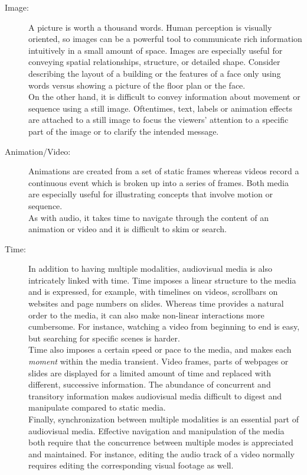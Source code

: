 \begin{description}
\item[Image:] A picture is worth a thousand words. Human perception is visually oriented, so images can be a powerful tool to communicate rich information intuitively in a small amount of space. Images are especially useful for conveying spatial relationships, structure, or detailed shape. Consider describing the layout of a building or the features of a face only using words versus showing a picture of the floor plan or the face.\\ 
On the other hand, it is difficult to convey information about movement or sequence using a still image. Oftentimes, text, labels or animation effects are attached to a still image to focus the viewers' attention to a specific part of the image or to clarify the intended message.\\

\item[Animation/Video:] Animations are created from a set of static frames whereas videos record a continuous event which is broken up into a series of frames. Both media are especially useful for illustrating concepts that involve motion or sequence.\\
As with audio, it takes time to navigate through the content of an animation or video and it is difficult to skim or search.\\

\item[Time:] In addition to having multiple modalities, audiovisual media is also intricately linked with time. Time imposes a linear structure to the media and is expressed, for example, with timelines on videos, scrollbars on websites and page numbers on slides. Whereas time provides a natural order to the media, it can also make non-linear interactions more cumbersome. For instance, watching a video from beginning to end is easy, but searching for specific scenes is harder.\\
Time also imposes a certain speed or pace to the media, and makes each \textit{moment}  within the media transient. Video frames, parts of webpages or slides are displayed for a limited amount of time and replaced with different, successive information. The abundance of concurrent and transitory information makes audiovisual media difficult to digest and manipulate compared to static media.\\
Finally, synchronization between multiple modalities is an essential part of audiovisual media. Effective navigation and manipulation of the media both require that the concurrence between multiple modes is appreciated and maintained. For instance, editing the audio track of a video normally requires editing the corresponding visual footage as well.
\end{description}

